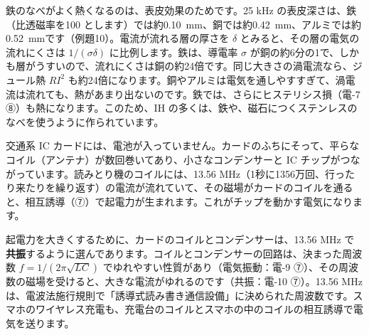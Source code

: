 鉄のなべがよく熱くなるのは、表皮効果のためです。25 kHz の表皮深さは、鉄（比透磁率を100 とします）では約\qty{0.10}{mm}、銅では約\qty{0.42}{mm}、アルミでは約\qty{0.52}{mm}です（例題10）。電流が流れる層の厚さを $\delta$ とみると、その層の電気の流れにくさは $1/(\sigma\delta)$ に比例します。鉄は、導電率 $\sigma$ が銅の約6分の1で、しかも層がうすいので、流れにくさは銅の約24倍です。同じ大きさの渦電流なら、ジュール熱 $RI^2$ も約24倍になります。銅やアルミは電気を通しやすすぎて、渦電流は流れても、熱があまり出ないのです。鉄では、さらにヒステリシス損（電-7 ⑧）も熱になります。このため、IH の多くは、鉄や、磁石につくステンレスのなべを使うように作られています。

\label{ph:電-8:sec13}
\noindent\begin{minipage}[c]{0.56\linewidth}\raggedright
交通系 IC カードには、電池が入っていません。カードのふちにそって、平らなコイル（アンテナ）が数回巻いてあり、小さなコンデンサーと IC チップがつながっています。読みとり機のコイルには、13.56 MHz（1秒に1356万回、行ったり来たりを繰り返す）の電流が流れていて、その磁場がカードのコイルを通ると、相互誘導（⑦）で起電力が生まれます。これがチップを動かす電気になります。
\end{minipage}\hfill
\begin{minipage}[c]{0.41\linewidth}\centering
{}
\end{minipage}
\par\vspace{3pt}
起電力を大きくするために、カードのコイルとコンデンサーは、13.56 MHz で\textbf{共振}するように選んであります。コイルとコンデンサーの回路は、決まった周波数 $f=1/(2\pi\sqrt{LC})$ でゆれやすい性質があり（電気振動：電-9 ⑦）、その周波数の磁場を受けると、大きな電流がゆれるのです（共振：電-10 ⑦）。13.56 MHz は、電波法施行規則で「誘導式読み書き通信設備」に決められた周波数です。スマホのワイヤレス充電も、充電台のコイルとスマホの中のコイルの相互誘導で電気を送ります。

